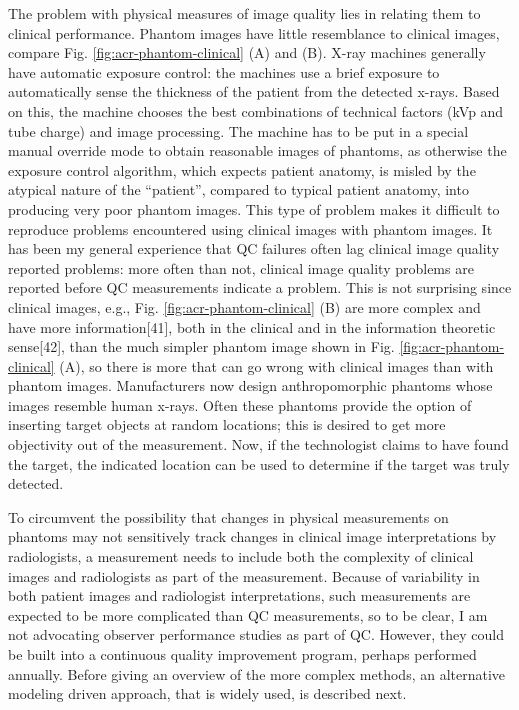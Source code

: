 \documentclass[
]{book}
\begin{document}
The problem with physical measures of image quality lies in relating them to clinical performance. Phantom images have little resemblance to clinical images, compare Fig. \ref{fig:acr-phantom-clinical} (A) and (B). X-ray machines generally have automatic exposure control: the machines use a brief exposure to automatically sense the thickness of the patient from the detected x-rays. Based on this, the machine chooses the best combinations of technical factors (kVp and tube charge) and image processing. The machine has to be put in a special manual override mode to obtain reasonable images of phantoms, as otherwise the exposure control algorithm, which expects patient anatomy, is misled by the atypical nature of the ``patient'', compared to typical patient anatomy, into producing very poor phantom images. This type of problem makes it difficult to reproduce problems encountered using clinical images with phantom images. It has been my general experience that QC failures often lag clinical image quality reported problems: more often than not, clinical image quality problems are reported before QC measurements indicate a problem. This is not surprising since clinical images, e.g., Fig. \ref{fig:acr-phantom-clinical} (B) are more complex and have more information{[}41{]}, both in the clinical and in the information theoretic sense{[}42{]}, than the much simpler phantom image shown in Fig. \ref{fig:acr-phantom-clinical} (A), so there is more that can go wrong with clinical images than with phantom images. Manufacturers now design anthropomorphic phantoms whose images resemble human x-rays. Often these phantoms provide the option of inserting target objects at random locations; this is desired to get more objectivity out of the measurement. Now, if the technologist claims to have found the target, the indicated location can be used to determine if the target was truly detected.

To circumvent the possibility that changes in physical measurements on phantoms may not sensitively track changes in clinical image interpretations by radiologists, a measurement needs to include both the complexity of clinical images and radiologists as part of the measurement. Because of variability in both patient images and radiologist interpretations, such measurements are expected to be more complicated than QC measurements, so to be clear, I am not advocating observer performance studies as part of QC. However, they could be built into a continuous quality improvement program, perhaps performed annually. Before giving an overview of the more complex methods, an alternative modeling driven approach, that is widely used, is described next.
\end{document}
